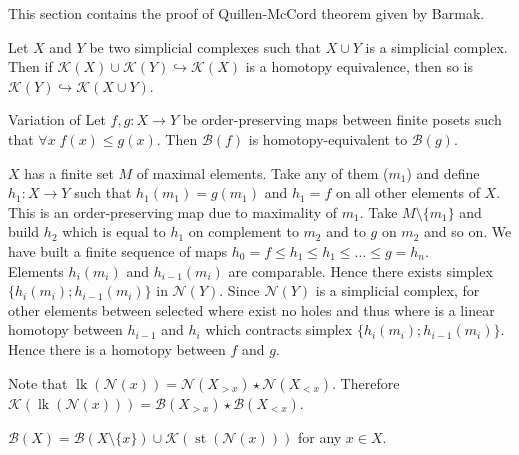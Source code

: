 This section contains the proof of Quillen-McCord theorem given by Barmak.

\begin{proposition} {\cite[Proposition 2.1]{Bar11}}
  \label{prop:homotopy_t}
  Let $X$ and $Y$ be two simplicial complexes such that $X \cup Y$ is a simplicial complex. Then if $\mathcal{K}(X) \cup \mathcal{K}(Y) \hookrightarrow \mathcal{K}(X)$ is a homotopy equivalence, then so is $\mathcal{K}(Y) \hookrightarrow \mathcal{K}(X \cup Y)$.
\end{proposition}

\begin{proposition} {Variation of \cite[Proposition 2.2]{Bar11}}
  \label{prop:comparison}
  Let $f,g : X \to Y$ be order-preserving maps between finite posets such that $\forall x\;f(x) \leq g(x)$. Then $\mathcal{B}(f)$ is homotopy-equivalent to $\mathcal{B}(g)$.
\end{proposition}

\begin{pf}
  $X$ has a finite set $M$ of maximal elements. Take any of them ($m_1$) and define $h_1 : X \to Y$ such that $h_1(m_1) = g(m_1)$ and $h_1 = f$ on all other elements of $X$. This is an order-preserving map due to maximality of $m_1$. Take $M \setminus \{m_1\}$ and build $h_2$ which is equal to $h_1$ on complement to $m_2$ and to $g$ on $m_2$ and so on. We have built a finite sequence of maps $h_0 = f \leq h_1 \leq h_1 \leq \ldots \leq g = h_n$.\\

  Elements $h_i(m_i)$ and $h_{i-1}(m_i)$ are comparable. Hence there exists simplex $\{h_i(m_i); h_{i-1}(m_i)\}$ in $\mathcal{N}(Y)$. Since $\mathcal{N}(Y)$ is a simplicial complex, for other elements between selected where exist no holes and thus where is a linear homotopy between $h_{i-1}$ and $h_{i}$ which contracts simplex $\{h_i(m_i); h_{i-1}(m_i)\}$.\\

  Hence there is a homotopy between $f$ and $g$.
\end{pf}

\begin{proposition}
  Note that $\operatorname{lk}(\mathcal{N}(x)) = \mathcal{N}(X_{>x}) \star \mathcal{N}(X_{<x})$. Therefore $\mathcal{K}(\operatorname{lk}(\mathcal{N}(x))) = \mathcal{B}(X_{>x}) \star \mathcal{B}(X_{<x})$.
\end{proposition}

\begin{remark}
  \label{covering}
  $\mathcal{B}(X) = \mathcal{B}(X \setminus \{x\}) \cup \mathcal{K}(\operatorname{st}(\mathcal{N}(x)))$ for any $x \in X$.\\
\end{remark}

